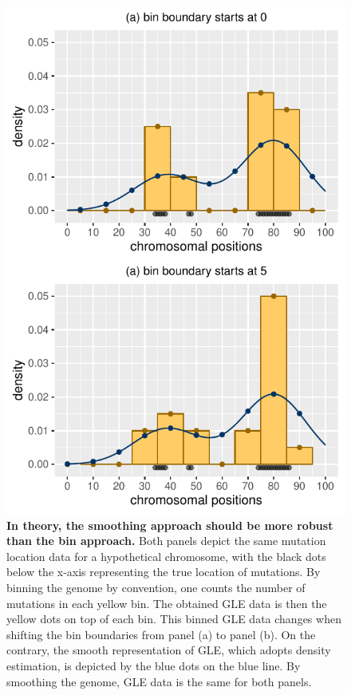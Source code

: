 \begin{figure}[h!]
  \begin{minipage}[c]{0.45\textwidth}
    \caption{
      \textbf{In theory, the smoothing approach should be more robust than the bin approach.} Both panels depict the same mutation location data for a hypothetical chromosome, with the black dots below the x-axis representing the true location of mutations. By binning the genome by convention, one counts the number of mutations in each yellow bin. The obtained GLE data is then the yellow dots on top of each bin. This binned GLE data changes when shifting the bin boundaries from panel (a) to panel (b). On the contrary, the smooth representation of GLE, which adopts \gls{density} estimation, is depicted by the blue dots on the blue line. By smoothing the genome, GLE data is the same for both panels. 
    } \label{fig:mutdistribution_demo}
  \end{minipage}\hfill
  \begin{minipage}[c]{0.52\textwidth}
    \includegraphics[width=\textwidth]{graphics/mutdistribution_demo.pdf}
  \end{minipage}
\end{figure}
